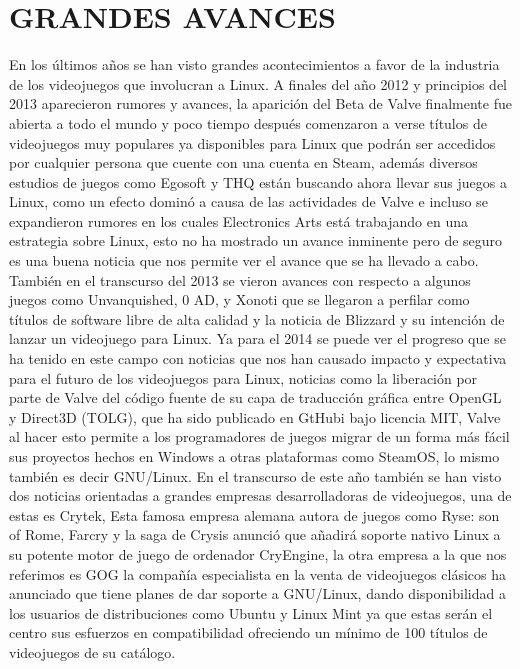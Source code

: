 \section*{GRANDES AVANCES}

En los últimos años se han visto grandes acontecimientos a favor
de la industria de los videojuegos que involucran a Linux. A
finales del año 2012 y principios del 2013 aparecieron rumores y
avances, la aparición del Beta de Valve finalmente fue abierta a
todo el mundo y poco tiempo después comenzaron a verse
títulos de videojuegos muy populares ya disponibles para Linux
que podrán ser accedidos por cualquier persona que cuente con
una cuenta en Steam, además diversos estudios de juegos como
Egosoft y THQ están buscando ahora llevar sus juegos a Linux,
como un efecto dominó a causa de las actividades de Valve e
incluso se expandieron rumores en los cuales Electronics Arts
está trabajando en una estrategia sobre Linux, esto no ha
mostrado un avance inminente pero de seguro es una buena
noticia que nos permite ver el avance que se ha llevado a cabo.
También en el transcurso del 2013 se vieron avances con
respecto a algunos juegos como Unvanquished, 0 AD, y
Xonoti que se llegaron a perfilar como títulos de software libre
de alta calidad y la noticia de Blizzard y su intención de lanzar
un videojuego para Linux. Ya para el 2014 se puede ver el
progreso que se ha tenido en este campo con noticias que nos
han causado impacto y expectativa para el futuro de los
videojuegos para Linux, noticias como la liberación por parte de
Valve del código fuente de su capa de traducción gráfica entre
OpenGL y Direct3D (TOLG), que ha sido publicado en GtHubi
bajo licencia MIT, Valve al hacer esto permite a los
programadores de juegos migrar de un forma más fácil sus
proyectos hechos en Windows a otras plataformas como
SteamOS, lo mismo también es decir GNU/Linux. 
En el transcurso de este año también se han visto dos noticias
orientadas a grandes empresas desarrolladoras de videojuegos,
una de estas es Crytek, Esta famosa empresa alemana autora de
juegos como Ryse: son of Rome, Farcry y la saga de Crysis
anunció que añadirá soporte nativo Linux a su potente motor de
juego de ordenador CryEngine, la otra empresa a la que nos
referimos es GOG la compañía especialista en la venta de
videojuegos clásicos ha anunciado que tiene planes de dar
soporte a GNU/Linux, dando disponibilidad a los usuarios de
distribuciones como Ubuntu y Linux Mint ya que estas serán el
centro sus esfuerzos en compatibilidad ofreciendo un mínimo de
100 títulos de videojuegos de su catálogo.


